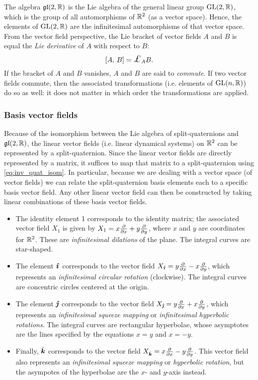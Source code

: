 The algebra $\glalg{2}{\real}$ is the Lie algebra of the general linear group $\glgroup{2}{\real}$, which is the group of all automorphisms of $\real^2$ (as a vector space). Hence, the elements of $\glgroup{2}{\real}$ are the infinitesimal automorphisms of that vector space. From the vector field perspective, the Lie bracket of vector fields $A$ and $B$ is equal the \emph{Lie derivative} of $A$ with respect to $B$:
\begin{equation}
    \liebr{A}{B} = \lied{A}{B}.
\end{equation}
If the bracket of $A$ and $B$ vanishes, $A$ and $B$ are said to \emph{commute}. If two vector fields commute, then the associated transformations (i.e. elements of $\glgroup{n}{\real}$) do so as well: it does not matter in which order the transformations are applied.

\subsubsection{Basis vector fields}
Because of the isomorphism between the Lie algebra of split-quaternions and $\glalg{2}{\real}$, the linear vector fields (i.e. linear dynamical systems) on $\real^2$ can be represented by a split-quaternion. Since the linear vector fields are directly represented by a matrix, it suffices to map that matrix to a split-quaternion using \cref{eq:inv_quat_isom}. In particular, because we are dealing with a vector space (of vector fields) we can relate the split-quaternion basis elements each to a specific basis vector field. Any other linear vector field can then be constructed by taking linear combinations of these basis vector fields. 

\begin{itemize}
    \item The identity element 1 corresponds to the identity matrix; the associated vector field $X_1$ is given by $X_1 = x\pdv{}{x} + y\pdv{}{y}$, where $x$ and $y$ are coordinates for $\real^2$. These are \emph{infinitesimal dilations} of the plane. The integral curves are star-shaped.
    \item The element $\quati$ corresponds to the vector field $X_{\quati} = y\pdv{}{x} - x\pdv{}{y}$, which represents an \emph{infinitesimal circular rotation} (clockwise). The integral curves are concentric circles centered at the origin.
    \item The element $\quatj$ corresponds to the vector field $X_{\quatj} = y\pdv{x} + x\pdv{}{y}$, which represents an \emph{infinitesimal squeeze mapping} or \emph{infinitesimal hyperbolic rotations}. The integral curves are rectangular hyperbolae, whose asymptotes are the lines specified by the equations $x = y$ and $x = -y$.  
    \item Finally, $\quatk$ corresponds to the vector field $X_{\quatk} = x\pdv{x} - y\pdv{}{y}$. This vector field also represents an \emph{infinitesimal squeeze mapping} or \emph{hyperbolic rotation}, but the asympotes of the hyperbolae are the $x$- and $y$-axis instead.
\end{itemize}

